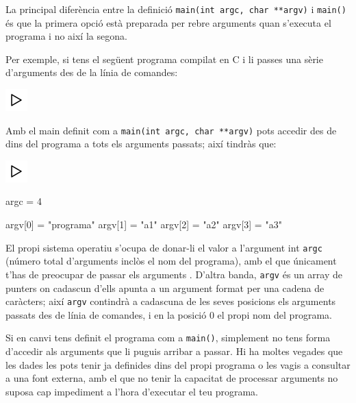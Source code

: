 \documentclass[]{book}
\newenvironment{Shaded}{\begin{snugshade}}{\end{snugshade}}
\newcommand{\DecValTok}[1]{\textcolor[rgb]{0.00,0.00,0.81}{#1}}
\newcommand{\StringTok}[1]{\textcolor[rgb]{0.31,0.60,0.02}{#1}}
\newcommand{\NormalTok}[1]{#1}
\begin{document}
La principal diferència entre la definició
\texttt{main(int\ argc,\ char\ **argv)} i \texttt{main()} és que la
primera opció està preparada per rebre arguments quan s'executa el
programa i no així la segona.

Per exemple, si tens el següent programa compilat en C i li passes una
sèrie d'arguments des de la línia de comandes:

\includegraphics{./img/play.png}

\begin{Shaded}
\end{Shaded}

Amb el main definit com a \texttt{main(int\ argc,\ char\ **argv)} pots
accedir des de dins del programa a tots els arguments passats; així
tindràs que:

\includegraphics{./img/play.png}

\begin{Shaded}
\begin{Highlighting}[]
\NormalTok{argc = }\DecValTok{4}

\NormalTok{argv[}\DecValTok{0}\NormalTok{] = }\StringTok{"programa"}
\NormalTok{argv[}\DecValTok{1}\NormalTok{] = }\StringTok{"a1"}
\NormalTok{argv[}\DecValTok{2}\NormalTok{] = }\StringTok{"a2"}
\NormalTok{argv[}\DecValTok{3}\NormalTok{] = }\StringTok{"a3"}
\end{Highlighting}
\end{Shaded}

El propi sistema operatiu s'ocupa de donar-li el valor a l'argument int
\texttt{argc} (número total d'arguments inclòs el nom del programa), amb
el que únicament t'has de preocupar de passar els arguments . D'altra
banda, \texttt{argv} és un array de punters on cadascun d'ells apunta a
un argument format per una cadena de caràcters; així \texttt{argv}
contindrà a cadascuna de les seves posicions els arguments passats des
de línia de comandes, i en la posició 0 el propi nom del programa.

Si en canvi tens definit el programa com a \texttt{main()}, simplement
no tens forma d'accedir als arguments que li puguis arribar a passar. Hi
ha moltes vegades que les dades les pots tenir ja definides dins del
propi programa o les vagis a consultar a una font externa, amb el que no
tenir la capacitat de processar arguments no suposa cap impediment a
l'hora d'executar el teu programa.
\end{document}
